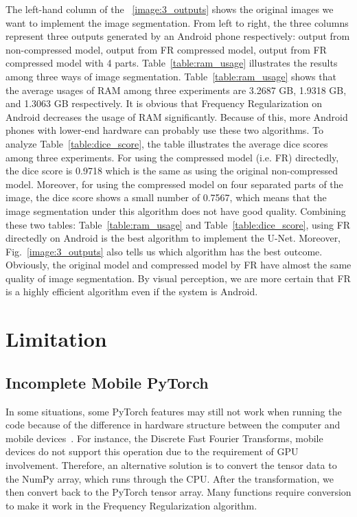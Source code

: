\documentclass[runningheads]{llncs}
\begin{document}
The left-hand column of the ~\ref{image:3_outputs} shows the original images we want to implement the image segmentation. From left to right, the three columns represent three outputs generated by an Android phone respectively: output from non-compressed model, output from FR compressed model, output from FR compressed model with 4 parts. Table~\ref{table:ram_usage} illustrates the results among three ways of image segmentation. Table~\ref{table:ram_usage} shows that the average usages of RAM among three experiments are 3.2687 GB, 1.9318 GB, and 1.3063 GB respectively. It is obvious that Frequency Regularization on Android decreases the usage of RAM significantly. Because of this, more Android phones with lower-end hardware can probably use these two algorithms. To analyze Table~\ref{table:dice_score}, the table illustrates the average dice scores among three experiments. For using the compressed model (i.e. FR) directedly, the dice score is 0.9718 which is the same as using the original non-compressed model. Moreover, for using the compressed model on four separated parts of the image, the dice score shows a small number of 0.7567, which means that the image segmentation under this algorithm does not have good quality. Combining these two tables: Table~\ref{table:ram_usage} and Table~\ref{table:dice_score}, using FR directedly on Android is the best algorithm to implement the U-Net. Moreover, Fig.~\ref{image:3_outputs} also tells us which algorithm has the best outcome. Obviously, the original model and compressed model by FR have almost the same quality of image segmentation. By visual perception, we are more certain that FR is a highly efficient algorithm even if the system is Android.


\section{Limitation}
\subsection{Incomplete Mobile PyTorch}
In some situations, some PyTorch features may still not work when running the code because of the difference in hardware structure between the computer and mobile devices~\cite{fojtik2022cpu}. For instance, the Discrete Fast Fourier Transforms, mobile devices do not support this operation due to the requirement of GPU involvement. Therefore, an alternative solution is to convert the tensor data to the NumPy array, which runs through the CPU. After the transformation, we then convert back to the PyTorch tensor array. Many functions require conversion to make it work in the Frequency Regularization algorithm.
\end{document}
